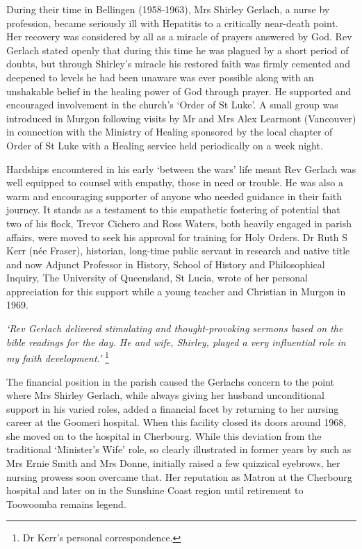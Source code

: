 During their time in Bellingen (1958-1963), Mrs Shirley Gerlach, a nurse by profession, became seriously ill with Hepatitis to a critically near-death point. Her recovery was considered by all as a miracle of prayers answered by God. Rev Gerlach stated openly that during this time he was plagued by a short period of doubts, but through Shirley's miracle his restored faith was firmly cemented and deepened to levels he had been unaware was ever possible along with an unshakable belief in the healing power of God through prayer. He supported and encouraged involvement in the church's `Order of St Luke'. A small group was introduced in Murgon following visits by Mr and Mrs Alex Learmont (Vancouver) in connection with the Ministry of Healing sponsored by the local chapter of Order of St Luke with a Healing service held periodically on a week night.

Hardships encountered in his early `between the wars' life meant Rev Gerlach was well equipped to counsel with empathy, those in need or trouble. He was also a warm and encouraging supporter of anyone who needed guidance in their faith journey. It stands as a testament to this empathetic fostering of potential that two of his flock, Trevor Cichero and Ross Waters, both heavily engaged in parish affairs, were moved to seek his approval for training for Holy Orders. Dr Ruth S Kerr (née Fraser), historian, long-time public servant in research and native title and now Adjunct Professor in History, School of History and Philosophical Inquiry, The University of Queensland, St Lucia, wrote of her personal appreciation for this support while a young teacher and Christian in Murgon in 1969.

\emph{`Rev Gerlach delivered stimulating and thought-provoking sermons based on the bible readings for the day. He and wife, Shirley, played a very influential role in my faith development.'} \footnote{Dr Kerr's personal correspondence.}

The financial position in the parish caused the Gerlachs concern to the point where Mrs Shirley Gerlach, while always giving her husband unconditional support in his varied roles, added a financial facet by returning to her nursing career at the Goomeri hospital. When this facility closed its doors around 1968, she moved on to the hospital in Cherbourg. While this deviation from the traditional `Minister's Wife' role, so clearly illustrated in former years by such as Mrs Ernie Smith and Mrs Donne, initially raised a few quizzical eyebrows, her nursing prowess soon overcame that. Her reputation as Matron at the Cherbourg hospital and later on in the Sunshine Coast region until retirement to Toowoomba remains legend.

